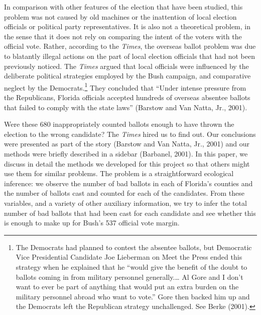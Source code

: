 \documentclass[11pt,titlepage]{article}
\begin{document}
In comparison with other features of the election that have been
studied, this problem was not caused by old machines or the
inattention of local election officials or political party
representatives.  It is also not a theoretical problem, in the sense
that it does not rely on comparing the intent of the voters with the
official vote.  Rather, according to the \emph{Times}, the overseas
ballot problem was due to blatantly illegal actions on the part of
local election officials that had not been previously noticed.  The
\emph{Times} argued that local officials were influenced by the
deliberate political strategies employed by the Bush campaign, and
comparative neglect by the Democrats.\footnote{The Democrats had
  planned to contest the absentee ballots, but Democratic Vice
  Presidential Candidate Joe Lieberman on Meet the Press ended this
  strategy when he explained that he ``would give the benefit of the
  doubt to ballots coming in from military personnel generally.\ldots
  Al Gore and I don't want to ever be part of anything that would put
  an extra burden on the military personnel abroad who want to vote.''
  Gore then backed him up and the Democrats left the Republican
  strategy unchallenged.  See Berke (2001).}  They concluded that
``Under intense pressure from the Republicans, Florida officials
accepted hundreds of overseas absentee ballots that failed to comply
with the state laws'' (Barstow and Van Natta, Jr.,
2001)\nocite{BarVan01}.

Were these 680 inappropriately counted ballots enough to have thrown
the election to the wrong candidate?  The \emph{Times} hired us to
find out.  Our conclusions were presented as part of the story
(Barstow and Van Natta, Jr., 2001) and our methods were briefly
described in a sidebar (Barbanel, 2001)\nocite{Barbanel01}.  In this
paper, we discuss in detail the methods we developed for this project
so that others might use them for similar problems.  The problem is a
straightforward ecological inference: we observe the number of bad
ballots in each of Florida's counties and the number of ballots cast
and counted for each of the candidates.  From these variables, and a
variety of other auxiliary information, we try to infer the total
number of bad ballots that had been cast for each candidate and see
whether this is enough to make up for Bush's 537 official vote margin.
\end{document}
